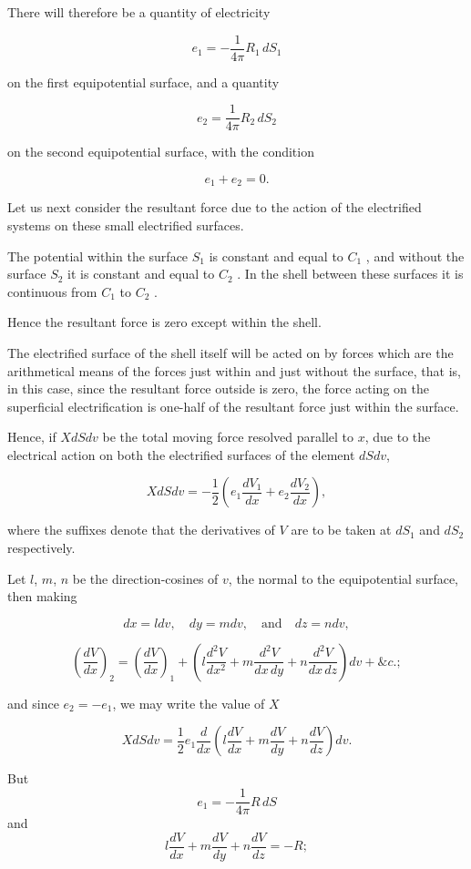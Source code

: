 \documentclass[11pt,a4paper]{article}
\begin{document}
There will therefore be a quantity of electricity

\[
e_1=-\frac{1}{4\pi}R_1\,dS_1
\]

on the first equipotential surface, and a quantity

\[
e_2=\frac{1}{4\pi}R_2\,dS_2
\]

on the second equipotential surface, with the condition

\[
e_1+e_2=0.
\]

Let us next consider the resultant force due to the action of the electrified systems on these small electrified surfaces.

The potential within the surface  $S_1$  is constant and equal to  $C_1$ , and without the surface  $S_2$  it is constant and equal to  $C_2$ . In the shell between these surfaces it is continuous from  $C_1$  to  $C_2$ .

Hence the resultant force is zero except within the shell.

The electrified surface of the shell itself will be acted on by forces which are the arithmetical means of the forces just within and just without the surface, that is, in this case, since the resultant force outside is zero, the force acting on the superficial electrification is one-half of the resultant force just within the surface.

Hence, if $XdSdv$ be the total moving force resolved parallel to $x$, due to the electrical action on both the electrified surfaces of the element $dSdv$,

\[
X dS dv = -\frac{1}{2} ( e_1 \frac{dV_1}{dx} + e_2 \frac{dV_2}{dx} ),
\]

where the suffixes denote that the derivatives of $V$ are to be taken at $dS_1$ and $dS_2$ respectively.

Let $l$, $m$, $n$ be the direction-cosines of $v$, the normal to the equipotential surface, then making

\[
dx = l dv, \quad dy = m dv, \quad \text{and} \quad dz = n dv,
\]

\[
\left(\frac{dV}{dx}\right)_2
=\left(\frac{dV}{dx}\right)_1+
\left(l\frac{d^2V}{dx^2}+m\frac{d^2V}{dx\,dy}+n\frac{d^2V}{dx\,dz}\right)dv+\&c.;
\]

and since $e_2=-e_1$, we may write the value of $X$

\[
XdSdv=\frac{1}{2}e_1\frac{d}{dx}
\left(l\frac{dV}{dx}+m\frac{dV}{dy}+n\frac{dV}{dz}\right)dv.
\]

But 
\[
e_1=-\frac{1}{4\pi}R\,dS
\]
and
\[
l\frac{dV}{dx}+m\frac{dV}{dy}+n\frac{dV}{dz}=-R;
\]
\end{document}
